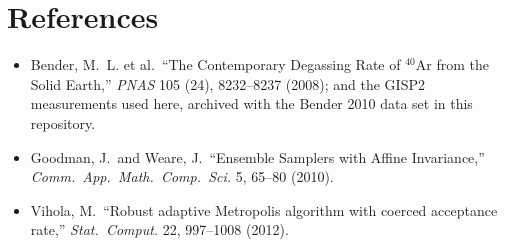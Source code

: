\documentclass[11pt,a4paper]{article}
\begin{document}
\section*{References}

\begin{itemize}[leftmargin=*]
  \item Bender, M.~L. et al.\ ``The Contemporary Degassing Rate of $^{40}$Ar
        from the Solid Earth,'' \textit{PNAS} 105 (24), 8232--8237 (2008);
        and the GISP2 measurements used here, archived with the Bender 2010
        data set in this repository.
  \item Goodman, J.\ and Weare, J.\ ``Ensemble Samplers with Affine
        Invariance,'' \textit{Comm.\ App.\ Math.\ Comp.\ Sci.} 5, 65--80 (2010).
  \item Vihola, M.\ ``Robust adaptive Metropolis algorithm with coerced
        acceptance rate,'' \textit{Stat.\ Comput.} 22, 997--1008 (2012).
\end{itemize}
\end{document}
